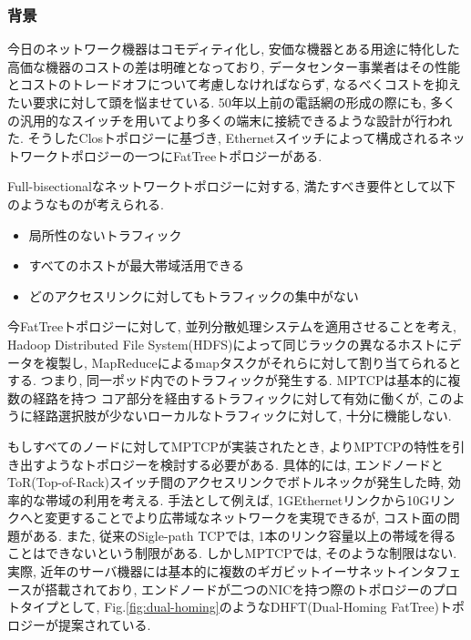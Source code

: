 \subsubsection{背景}

今日のネットワーク機器はコモディティ化し, 安価な機器とある用途に特化した高価な機器のコストの差は明確となっており,
データセンター事業者はその性能とコストのトレードオフについて考慮しなければならず,
なるべくコストを抑えたい要求に対して頭を悩ませている\cite{fattree}.
50年以上前の電話網の形成の際にも, 多くの汎用的なスイッチを用いてより多くの端末に接続できるような設計が行われた\cite{clos}. 
そうしたClosトポロジーに基づき,
Ethernetスイッチによって構成されるネットワークトポロジーの一つにFatTreeトポロジーがある\cite{fattree}. 

Full-bisectionalなネットワークトポロジーに対する, 満たすべき要件として以下のようなものが考えられる\cite{improving}.
\begin{itemize}
\item 局所性のないトラフィック
\item すべてのホストが最大帯域活用できる
\item どのアクセスリンクに対してもトラフィックの集中がない
\end{itemize} 

今FatTreeトポロジーに対して, 並列分散処理システムを適用させることを考え, Hadoop Distributed File
System(HDFS)によって同じラックの異なるホストにデータを複製し, MapReduceによるmapタスクがそれらに対して割り当てられるとする.
つまり, 同一ポッド内でのトラフィックが発生する.
MPTCPは基本的に複数の経路を持つ コア部分を経由するトラフィックに対して有効に働くが, このように経路選択肢が少ないローカルなトラフィックに対して,
十分に機能しない.

もしすべてのノードに対してMPTCPが実装されたとき, よりMPTCPの特性を引き出すようなトポロジーを検討する必要がある. 
具体的には, エンドノードとToR(Top-of-Rack)スイッチ間のアクセスリンクでボトルネックが発生した時, 効率的な帯域の利用を考える. 
手法として例えば, 1GEthernetリンクから10Gリンクへと変更することでより広帯域なネットワークを実現できるが, コスト面の問題がある. 
また, 従来のSigle-path TCPでは, 1本のリンク容量以上の帯域を得ることはできないという制限がある. 
しかしMPTCPでは, そのような制限はない. 
実際, 近年のサーバ機器には基本的に複数のギガビットイーサネットインタフェースが搭載されており,
エンドノードが二つのNICを持つ際のトポロジーのプロトタイプとして,
Fig.\ref{fig:dual-homing}のようなDHFT(Dual-Homing
FatTree)トポロジーが提案されている\cite{improving}.

